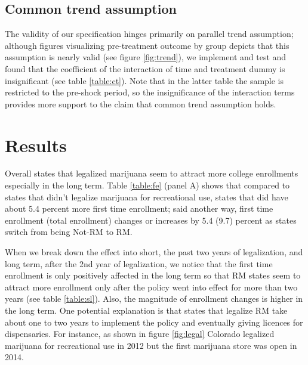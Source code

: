 \documentclass[12pt]{article}%
\begin{document}
\subsection{Common trend assumption}

The validity of our specification hinges primarily on parallel trend assumption; although figures visualizing pre-treatment outcome by group depicts that this assumption is nearly valid (see figure \ref{fig:trend}), we implement \cite{abadie2005semiparametric}  and  \cite{prince2017impact} test and found that  the coefficient of the interaction of time and treatment dummy is insignificant (see table \ref{table:ct}). Note that in the latter table the sample is restricted to the pre-shock period, so the insignificance of the interaction terms provides more support to the claim that common trend assumption holds. 


\section{Results}

Overall states that legalized marijuana seem to attract more college enrollments especially in the long term. Table \ref{table:fe} (panel A) shows that compared to states that didn't legalize marijuana for recreational use, states that did have about 5.4 percent more first time enrollment; said another way, first time enrollment (total enrollment) changes or increases by 5.4 (9.7) percent as states switch from being Not-RM to RM.

When we break down the effect into short, the past two years of legalization, and long term, after the 2nd year of legalization, we notice that the first time enrollment is only positively affected in the long term so that RM states seem to attract more enrollment only after the policy went into effect for more than two years (see table \ref{table:sl}). Also, the magnitude of enrollment changes is higher in the long term. One potential explanation is that states that legalize RM take about one to two years to implement the policy and eventually giving licences for dispensaries. For instance, as shown in figure \ref{fig:legal} Colorado legalized marijuana for recreational use in 2012 but the first marijuana store was open in 2014. 
\end{document}
